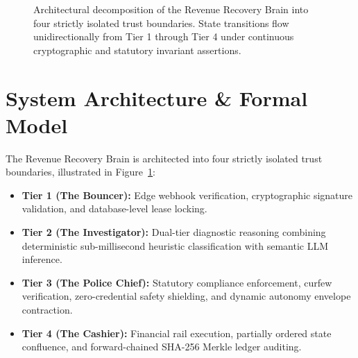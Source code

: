 \documentclass[10pt, twocolumn, a4paper]{article}
\begin{document}
\begin{figure}[t]
\centering
{}
\caption{Architectural decomposition of the Revenue Recovery Brain into four strictly isolated trust boundaries. State transitions flow unidirectionally from Tier 1 through Tier 4 under continuous cryptographic and statutory invariant assertions.}
\label{fig:architecture}
\end{figure}

\section{System Architecture \& Formal Model}

The Revenue Recovery Brain is architected into four strictly isolated trust boundaries, illustrated in Figure~\ref{fig:architecture}:
\begin{itemize}[leftmargin=*]
  \item \textbf{Tier 1 (The Bouncer):} Edge webhook verification, cryptographic signature validation, and database-level lease locking.
  \item \textbf{Tier 2 (The Investigator):} Dual-tier diagnostic reasoning combining deterministic sub-millisecond heuristic classification with semantic LLM inference.
  \item \textbf{Tier 3 (The Police Chief):} Statutory compliance enforcement, curfew verification, zero-credential safety shielding, and dynamic autonomy envelope contraction.
  \item \textbf{Tier 4 (The Cashier):} Financial rail execution, partially ordered state confluence, and forward-chained SHA-256 Merkle ledger auditing.
\end{itemize}
\end{document}
